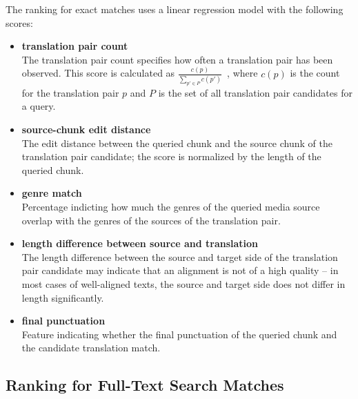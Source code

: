 The ranking for exact matches uses a linear regression model with the following scores:

\begin{itemize}
	\item \textbf{translation pair count}\\
	The translation pair count specifies how often a translation pair has been observed. This score is calculated as $\frac{c(p)}{ \sum_{p' \in P}{c(p')}  } $\ , where $c(p)$ is the count for the translation pair $p$ and $P$ is the set of all translation pair candidates for a query.
	
	\item \textbf{source-chunk edit distance}\\
	The edit distance between the queried chunk and the source chunk of the translation pair candidate; the score is normalized by the length of the queried chunk.
	
	\item \textbf{genre match}\\
	Percentage indicting how much the genres of the queried media source overlap with the genres of the sources of the translation pair.

	\item \textbf{length difference between source and translation}\\
	The length difference between the source and target side of the translation pair candidate may indicate that an alignment is not of a high quality -- in most cases of well-aligned texts, the source and target side does not differ in length significantly.
	
	\item \textbf{final punctuation}\\
	Feature indicating whether the final punctuation of the queried chunk and the candidate translation match.
	
	
	
\end{itemize}



\subsection{Ranking for Full-Text Search Matches}



